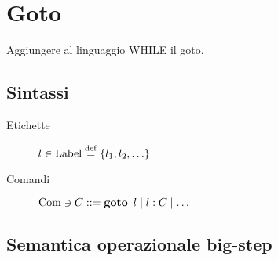 \section{Goto}

Aggiungere al linguaggio WHILE il goto.

\subsection{Sintassi}

\begin{description}
\item[Etichette] $l \in \Label \defeq \{ l_1, l_2, \ldots \}$
\item[Comandi] $\mathrm{Com} \ni C ::= \mathop{\textup{\textbf{goto}}}\ l \mathrel{\mid} l: C \mathrel{\mid} \ldots$
\end{description}

\subsection{Semantica operazionale big-step}

